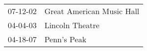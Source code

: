 \begin{supertabular}{p{0.25\columnwidth}p{0.75\columnwidth}}
 07-12-02 &  Great American Music Hall \\
 04-04-03 &            Lincoln Theatre \\
 04-18-07 &                Penn's Peak \\
\end{supertabular}
